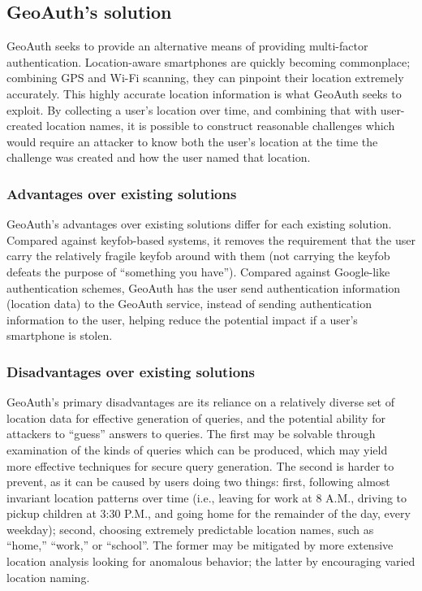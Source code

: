 \documentclass[11pt]{article} %
\begin{document}
\subsection{GeoAuth's solution}
GeoAuth seeks to provide an alternative means of providing multi-factor authentication. Location-aware smartphones are quickly becoming commonplace; combining GPS and Wi-Fi scanning, they can pinpoint their location extremely accurately. This highly accurate location information is what GeoAuth seeks to exploit. By collecting a user's location over time, and combining that with user-created location names, it is possible to construct reasonable challenges which would require an attacker to know both the user's location at the time the challenge was created and how the user named that location.

\subsubsection{Advantages over existing solutions}
GeoAuth's advantages over existing solutions differ for each existing solution. Compared against keyfob-based systems, it removes the requirement that the user carry the relatively fragile keyfob around with them (not carrying the keyfob defeats the purpose of ``something you have''). Compared against Google-like authentication schemes, GeoAuth has the user send authentication information (location data) to the GeoAuth service, instead of sending authentication information to the user, helping reduce the potential impact if a user's smartphone is stolen.

\subsubsection{Disadvantages over existing solutions}
GeoAuth's primary disadvantages are its reliance on a relatively diverse set of location data for effective generation of queries, and the potential ability for attackers to ``guess'' answers to queries. The first may be solvable through examination of the kinds of queries which can be produced, which may yield more effective techniques for secure query generation. The second is harder to prevent, as it can be caused by users doing two things: first, following almost invariant location patterns over time (i.e., leaving for work at 8 A.M., driving to pickup children at 3:30 P.M., and going home for the remainder of the day, every weekday); second, choosing extremely predictable location names, such as ``home,'' ``work,'' or ``school''. The former may be mitigated by more extensive location analysis looking for anomalous behavior; the latter by encouraging varied location naming.
\end{document}
